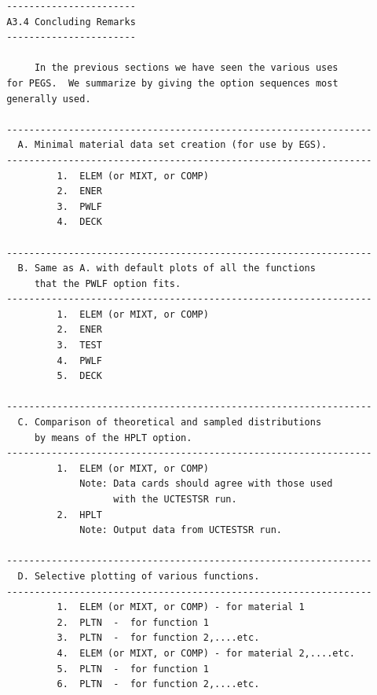 \newpage \begin{verbatim}
 -----------------------
 A3.4 Concluding Remarks
 -----------------------

      In the previous sections we have seen the various uses
 for PEGS.  We summarize by giving the option sequences most
 generally used.

 -----------------------------------------------------------------
   A. Minimal material data set creation (for use by EGS).
 -----------------------------------------------------------------
          1.  ELEM (or MIXT, or COMP)
          2.  ENER
          3.  PWLF
          4.  DECK

 -----------------------------------------------------------------
   B. Same as A. with default plots of all the functions
      that the PWLF option fits.
 -----------------------------------------------------------------
          1.  ELEM (or MIXT, or COMP)
          2.  ENER
          3.  TEST
          4.  PWLF
          5.  DECK

 -----------------------------------------------------------------
   C. Comparison of theoretical and sampled distributions
      by means of the HPLT option.
 -----------------------------------------------------------------
          1.  ELEM (or MIXT, or COMP)
              Note: Data cards should agree with those used
                    with the UCTESTSR run.
          2.  HPLT
              Note: Output data from UCTESTSR run.

 -----------------------------------------------------------------
   D. Selective plotting of various functions.
 -----------------------------------------------------------------
          1.  ELEM (or MIXT, or COMP) - for material 1
          2.  PLTN  -  for function 1
          3.  PLTN  -  for function 2,....etc.
          4.  ELEM (or MIXT, or COMP) - for material 2,....etc.
          5.  PLTN  -  for function 1
          6.  PLTN  -  for function 2,....etc.
\end{verbatim}
